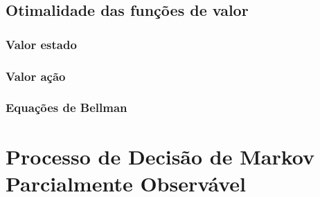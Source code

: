\documentclass{article}
\begin{document}
    \subsection{Otimalidade das funções de valor}
    
        \subsubsection{Valor estado}
        
        \subsubsection{Valor ação}
        
        \subsubsection{Equações de Bellman}
    
\section{Processo de Decisão de Markov Parcialmente Observável}
\end{document}
